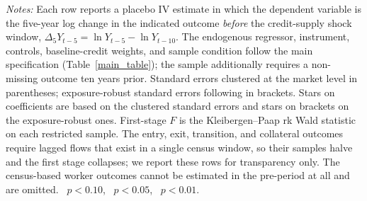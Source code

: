 \begin{threeparttable}
\begin{tablenotes}[flushleft]
        \footnotesize
        \item \textit{Notes:} Each row reports a placebo IV estimate in which the dependent variable is the five-year log change in the indicated outcome \emph{before} the credit-supply shock window, $\Delta_5 Y_{t-5} = \ln Y_{t-5} - \ln Y_{t-10}$. The endogenous regressor, instrument, controls, baseline-credit weights, and sample condition follow the main specification (Table~\ref{main_table}); the sample additionally requires a non-missing outcome ten years prior. Standard errors clustered at the market level in parentheses; exposure-robust standard errors following \citet{adao2019shiftshare} in brackets. Stars on coefficients are based on the clustered standard errors and stars on brackets on the exposure-robust ones. First-stage $F$ is the Kleibergen--Paap rk Wald statistic on each restricted sample. The entry, exit, transition, and collateral outcomes require lagged flows that exist in a single census window, so their samples halve and the first stage collapses; we report these rows for transparency only. The census-based worker outcomes cannot be estimated in the pre-period at all and are omitted. \sym{*}~$p<0.10$, \sym{**}~$p<0.05$, \sym{***}~$p<0.01$.
    \end{tablenotes}
\end{threeparttable}